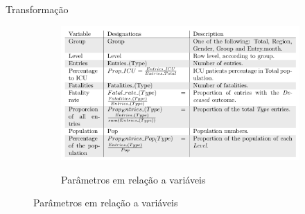 \documentclass[pdf]
{beamer}
\begin{document}
\begin{frame}{Transformação}
\begin{figure}[!ht]
\begin{subfigure}{0.38\textwidth}
    \vspace{0.2cm}
    \caption*{Parâmetros em relação a variáveis}
    \vspace{-0.4cm}
    \includegraphics[width=\textwidth]{Imagens/Dados_Transf_Perc.png}\\
\end{subfigure}
\end{figure}

\end{frame}
\end{document}
